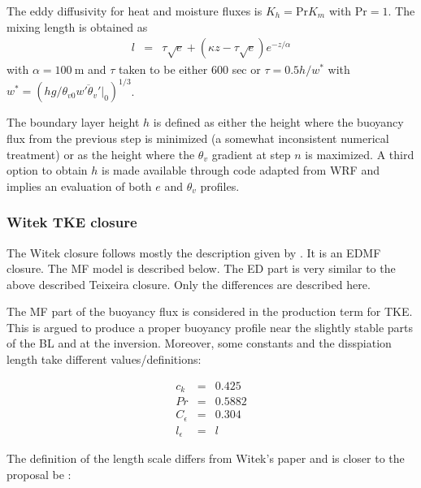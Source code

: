 \documentclass[dvipdfmx,a4paper,10pt]{article}
\begin{document}
The eddy diffusivity for heat and moisture fluxes is $K_h=\mathrm{Pr} K_m$ with $\mathrm{Pr}=1$. The mixing length is obtained as
\begin{eqnarray}
 l &=& \tau \sqrt{e} + (\kappa z - \tau \sqrt{e}) e^{-z/\alpha}
\end{eqnarray}
with $\alpha=100\mathrm{~m}$ and $\tau$ taken to be either 600 sec or $\tau=0.5 h/w^*$ with $w^*=(hg/\theta_{v0} \overline{w'\theta_v'}|_0)^{1/3}$. 

The boundary layer height $h$ is defined as either the height where the buoyancy flux from the previous step is minimized (a somewhat inconsistent numerical treatment) or as the height where the $\theta_v$ gradient at step $n$ is maximized. A third option to obtain $h$ is made available through code adapted from WRF and implies an evaluation of both $e$ and $\theta_v$ profiles. 


\subsubsection{Witek TKE closure}

The Witek closure follows mostly the description given by \cite{witek11}. It is an EDMF closure. The MF model is described below. The ED part is very similar to the above described Teixeira closure. Only the differences are described here.

The MF part of the buoyancy flux is considered in the production term for TKE. This is argued to produce a proper buoyancy profile near the slightly stable parts of the BL and at the inversion. 
Moreover, some constants and the disspiation length take different values/definitions:

\begin{eqnarray}
 c_k&=&0.425\\
 Pr&=&0.5882\\
 C_{\epsilon}&=&0.304\\
 l_{\epsilon}&=&l
\end{eqnarray}

The definition of the length scale differs from Witek's paper and is closer to the proposal be \cite{suselj13}:
\end{document}
